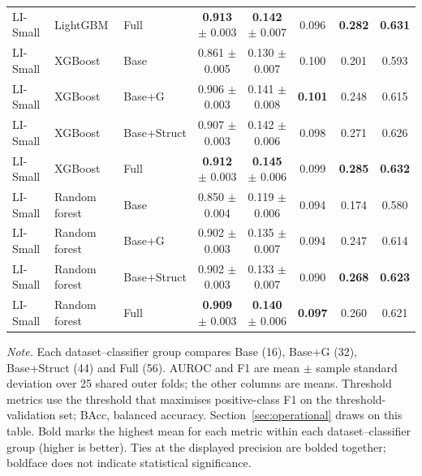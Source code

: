 \begin{table}[htbp]
\begin{threeparttable}
\begin{tabular}{lllccccc}
LI-Small & LightGBM & Full & \textbf{0.913} $\pm$ 0.003 & \textbf{0.142} $\pm$ 0.007 & 0.096 & \textbf{0.282} & \textbf{0.631} \\
LI-Small & XGBoost & Base & 0.861 $\pm$ 0.005 & 0.130 $\pm$ 0.007 & 0.100 & 0.201 & 0.593 \\
LI-Small & XGBoost & Base+G & 0.906 $\pm$ 0.003 & 0.141 $\pm$ 0.008 & \textbf{0.101} & 0.248 & 0.615 \\
LI-Small & XGBoost & Base+Struct & 0.907 $\pm$ 0.003 & 0.142 $\pm$ 0.006 & 0.098 & 0.271 & 0.626 \\
LI-Small & XGBoost & Full & \textbf{0.912} $\pm$ 0.003 & \textbf{0.145} $\pm$ 0.006 & 0.099 & \textbf{0.285} & \textbf{0.632} \\
LI-Small & Random forest & Base & 0.850 $\pm$ 0.004 & 0.119 $\pm$ 0.006 & 0.094 & 0.174 & 0.580 \\
LI-Small & Random forest & Base+G & 0.902 $\pm$ 0.003 & 0.135 $\pm$ 0.007 & 0.094 & 0.247 & 0.614 \\
LI-Small & Random forest & Base+Struct & 0.902 $\pm$ 0.003 & 0.133 $\pm$ 0.007 & 0.090 & \textbf{0.268} & \textbf{0.623} \\
LI-Small & Random forest & Full & \textbf{0.909} $\pm$ 0.003 & \textbf{0.140} $\pm$ 0.006 & \textbf{0.097} & 0.260 & 0.621 \\
\bottomrule
\end{tabular}
\begin{tablenotes}[flushleft]
\footnotesize
\setlength{\labelsep}{0pt}\item[] \textit{Note.} Each dataset--classifier group compares Base (16), Base+G (32), Base+Struct (44) and Full (56). AUROC and F1 are mean $\pm$ sample standard deviation over 25 shared outer folds; the other columns are means. Threshold metrics use the threshold that maximises positive-class F1 on the threshold-validation set; BAcc, balanced accuracy. Section~\ref{sec:operational} draws on this table. Bold marks the highest mean for each metric within each dataset--classifier group (higher is better). Ties at the displayed precision are bolded together; boldface does not indicate statistical significance.
\end{tablenotes}
\end{threeparttable}
\end{table}
